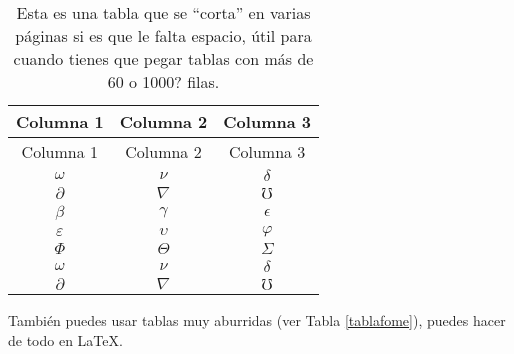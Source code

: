 \documentclass[letterpaper,11pt]{article}	%
\newcommand{\quotes}[1]{``#1''}						%
\newcommand{\newparnl}[1]{#1 \par}		%
\begin{document}
		\begin{longtable}{ccc}
			\caption{Esta es una tabla que se \quotes{corta} en varias páginas si es que le falta espacio, útil para cuando tienes que pegar tablas con más de 60 o 1000? filas.}\label{foo}\\
			\hline
			Columna 1 & Columna 2 & Columna 3\\\hline
			\endfirsthead
			\hline
			Columna 1 & Columna 2 & Columna 3\\
			\hline
			\endhead
			\hline
			\endfoot
			\hline
			\endlastfoot
			$\omega$ & $\nu$ & $\delta$\\     
			$\partial$ & $\nabla$ & $\mho$\\
			$\beta$ & $\gamma$ & $\epsilon$\\   
			$\varepsilon$ & $\upsilon$ & $\varphi$\\
			$\Phi$ & $\Theta$ & $\varSigma$\\
			$\omega$ & $\nu$ & $\delta$\\     
			$\partial$ & $\nabla$ & $\mho$\\ 
		\end{longtable}
		
		\newparnl{También puedes usar tablas muy aburridas (ver Tabla \ref{tablafome}), puedes hacer de todo en \LaTeX.}
		
\end{document}
